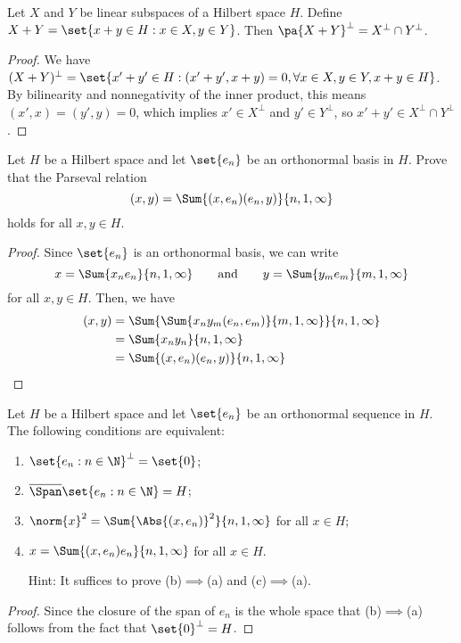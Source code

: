 \documentclass[10pt,letterpaper,twoside]{hmcpset}
\begin{document}
\begin{problem}[4]
 Let $X$ and $Y$ be linear subspaces of a Hilbert space $H$.  Define $X+Y = \set{x + y \in H : x \in X, y \in Y}$. Then $\pa{X + Y}^\perp = X^\perp \cap Y^\perp$.
\end{problem}

\begin{solution}
 \begin{proof}
  We have $(X+Y)^\perp = \set{x'+y' \in H : (x'+y',x+y) =0, \forall x\in X, y\in Y, x+y\in H}$. By bilinearity and nonnegativity of the inner product, this means $(x',x) = (y',y) = 0$, which implies $x' \in X^\perp$ and $y' \in Y^\perp$, so $x'+y' \in X^\perp \cap Y^\perp$.
 \end{proof}

\end{solution}

\begin{problem}[5]
 Let $H$ be a Hilbert space and let $\set{e_n}$ be an orthonormal basis in $H$. Prove that the Parseval relation \[(x,y) = \Sum{(x,e_n)(e_n,y)}{n,1,\infty}\] holds for all $x,y \in H$.
\end{problem}

\begin{solution}
\begin{proof}
  Since $\set{e_n}$ is an orthonormal basis, we can write
 \[x = \Sum{x_ne_n}{n,1,\infty}\qquad\text{and}\qquad y = \Sum{y_me_m}{m,1,\infty}\]
 for all $x,y \in H$.  Then, we have
 \begin{align*}
  (x,y) &= \Sum{\Sum{x_ny_m (e_n,e_m)}{m,1,\infty}}{n,1,\infty} \\
  {}&= \Sum{x_ny_n}{n,1,\infty} \\
  {}&= \Sum{(x,e_n)(e_n,y)}{n,1,\infty}
 \end{align*}
\end{proof}
\end{solution}


\begin{problem}[6]
 Let $H$ be a Hilbert space and let $\set{e_n}$ be an orthonormal sequence in $H$.  The following conditions are equivalent:
 \begin{enumerate}[label=(\alph*)]
  \item $\set{e_n : n \in \N}^\perp = \set{0}$;
  \item $\overline{\Span}\set{e_n : n \in \N} = H$;
  \item $\norm{x}^2 = \Sum{\Abs{(x,e_n)}^2}{n,1,\infty}$ for all $x \in H$;
  \item $x = \Sum{(x,e_n)e_n}{n,1,\infty}$ for all $x \in H$.
  
  Hint: It suffices to prove (b)$\implies$(a) and (c)$\implies$(a).
 \end{enumerate}

\end{problem}

\begin{solution}
 \begin{proof}
  Since the closure of the span of ${e_n}$ is the whole space that (b)$\implies$(a) follows from the fact that $\set{0}^\perp = H$.
 \end{proof}

\end{solution}
\end{document}
